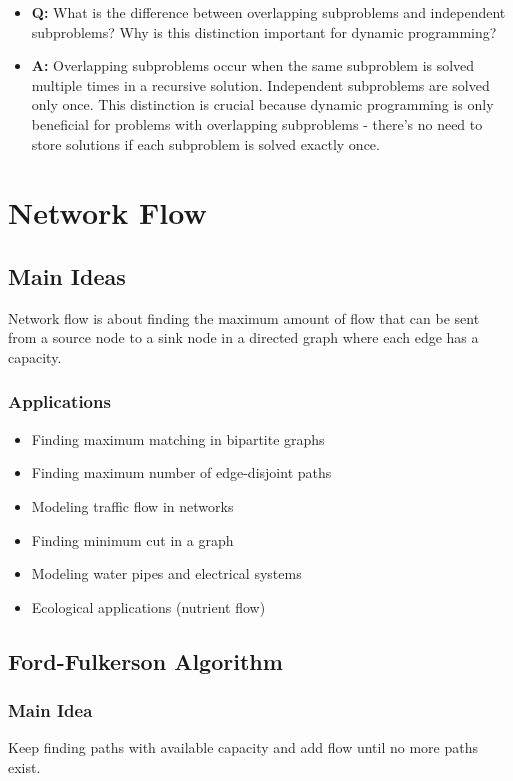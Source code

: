 \documentclass[11pt,a4paper]{article}
\begin{document}
\begin{multicols}{2}
\begin{itemize}
    \item \textbf{Q:} What is the difference between overlapping subproblems and independent subproblems? Why is this distinction important for dynamic programming?
    \item \textbf{A:} Overlapping subproblems occur when the same subproblem is solved multiple times in a recursive solution. Independent subproblems are solved only once. This distinction is crucial because dynamic programming is only beneficial for problems with overlapping subproblems - there's no need to store solutions if each subproblem is solved exactly once.
\end{itemize}

\section{Network Flow}
\subsection{Main Ideas}
Network flow is about finding the maximum amount of flow that can be sent from a source node to a sink node in a directed graph where each edge has a capacity.

\subsubsection{Applications}
\begin{itemize}
    \item Finding maximum matching in bipartite graphs
    \item Finding maximum number of edge-disjoint paths
    \item Modeling traffic flow in networks
    \item Finding minimum cut in a graph
    \item Modeling water pipes and electrical systems
    \item Ecological applications (nutrient flow)
\end{itemize}

\subsection{Ford-Fulkerson Algorithm}
\subsubsection{Main Idea}
Keep finding paths with available capacity and add flow until no more paths exist.


\end{multicols}
\end{document}
